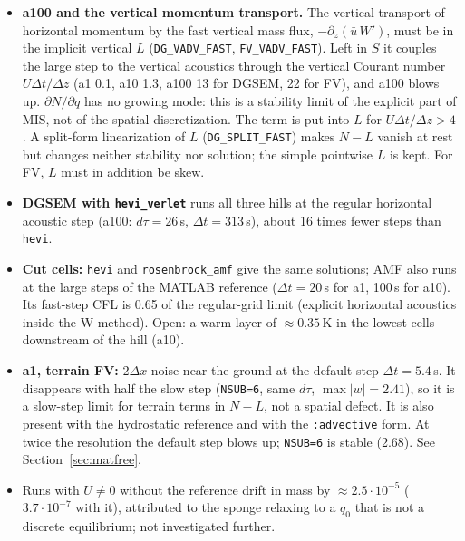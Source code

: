 \documentclass[11pt,a4paper]{article}
\newcommand{\code}[1]{\texttt{#1}}
\newcommand{\dt}{\Delta t}
\begin{document}
\begin{itemize}
\item \textbf{a100 and the vertical momentum transport.} The vertical transport of horizontal
  momentum by the fast vertical mass flux, $-\partial_z(\bar u\,W')$, must be in the implicit
  vertical $L$ (\code{DG\_VADV\_FAST}, \code{FV\_VADV\_FAST}). Left in $S$ it couples the large step
  to the vertical acoustics through the vertical Courant number $U\dt/\Delta z$ (a1 0.1, a10 1.3,
  a100 13 for DGSEM, 22 for FV), and a100 blows up. $\partial N/\partial q$ has no growing mode: this
  is a stability limit of the explicit part of MIS, not of the spatial discretization. The term is
  put into $L$ for $U\dt/\Delta z > 4$. A split-form linearization of $L$ (\code{DG\_SPLIT\_FAST})
  makes $N - L$ vanish at rest but changes neither stability nor solution; the simple pointwise $L$
  is kept. For FV, $L$ must in addition be skew.
\item \textbf{DGSEM with \code{hevi\_verlet}} runs all three hills at the regular horizontal acoustic
  step (a100: $d\tau = 26$\,s, $\dt = 313$\,s), about 16 times fewer steps than \code{hevi}.
\item \textbf{Cut cells:} \code{hevi} and \code{rosenbrock\_amf} give the same solutions; AMF also runs
  at the large steps of the MATLAB reference ($\dt = 20$\,s for a1, 100\,s for a10). Its fast-step
  CFL is 0.65 of the regular-grid limit (explicit horizontal acoustics inside the W-method).
  Open: a warm layer of $\approx0.35$\,K in the lowest cells downstream of the hill (a10).
\item \textbf{a1, terrain FV:} 2$\Delta x$ noise near the ground at the default step
  $\dt = 5.4$\,s. It disappears with half the slow step (\code{NSUB=6}, same $d\tau$,
  $\max|w| = 2.41$), so it is a slow-step limit for terrain terms in $N - L$, not a spatial defect.
  It is also present with the hydrostatic reference and with the \code{:advective} form. At twice
  the resolution the default step blows up; \code{NSUB=6} is stable (2.68). See
  Section~\ref{sec:matfree}.
\item Runs with $U\ne0$ without the reference drift in mass by $\approx2.5\cdot10^{-5}$
  ($3.7\cdot10^{-7}$ with it), attributed to the sponge relaxing to a $q_0$ that is not a discrete
  equilibrium; not investigated further.
\end{itemize}
\end{document}

